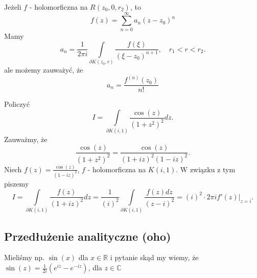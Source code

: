 \documentclass[../main.tex]{subfiles}
\begin{document}
Jeżeli $f$ - holomorficzna na $R(z_0, 0, r_2)$, to
\[
    f(z) = \sum_{n = 0}^{\infty} a_n (z-z_0)^n
\]
Mamy
\[
    a_n = \frac{1}{2 \pi i} \int\limits_{\partial K(z_0, r)} \frac{f(\xi)}{(\xi - z_0)^{n+1}},\quad r_1 < r < r_2
.\]
ale możemy zauważyć, że
\[
    a_n = \frac{f^{(n)}(z_0)}{n!}
\]
\begin{przyklad}
    Policzyć
    \[
        I = \int\limits_{\partial K(i, 1)} \frac{\cos (z)}{(1+z^2)^2} dz
    .\]
Zauważmy, że
    \[
        \frac{\cos(z)}{(1+z^2)^2} = \frac{\cos(z)}{(1+iz)^2(1-iz)^2}
    .\]
    Niech $f(z) = \frac{\cos(z)}{(1 - iz)^2}$, $f$ - holomorficzna na $K(i,1)$. W związku z tym piszemy
    \[
        I = \int\limits_{\partial K(i,1)} \frac{f(z)}{(1+iz)^2}dz = \frac{1}{(i)^2} \int\limits_{\partial K(i,1)} \frac{f(z) dz}{(z-i)^2} = (i)^2 \cdot 2\pi i \left. f'(z) \right|_{z = i}
    .\]
\end{przyklad}
\subsection{Przedłużenie analityczne (oho)}
Mieliśmy np. $\sin(x)$ dla $x\in \mathbb{R}$ i pytanie skąd my wiemy, że $\sin(z) = \frac{1}{2i} \left(e^{iz} - e^{-iz}\right)$, dla $z \in \mathbb{C}$
\end{document}

